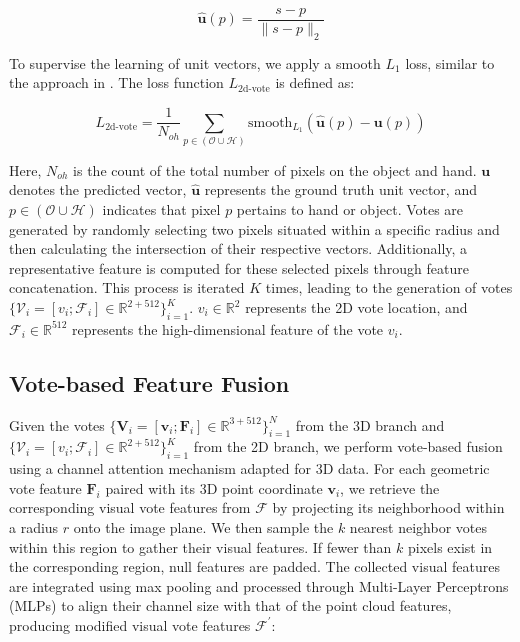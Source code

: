 \begin{equation} 
\hat{\mathbf{u}}(p) = \frac{s - p}{\parallel s - p \parallel_2}
\end{equation}

\noindent To supervise the learning of unit vectors, we apply a smooth $L_1$ loss, similar to the approach in \cite{girshick2015fast}. The loss function $L_{\text{2d-vote}}$ is defined as:

\begin{equation} 
L_{\text{2d-vote}} = \dfrac{1}{N_{oh}} \sum_{p \in (\mathcal{O} \cup \mathcal{H})} \text{smooth}_{L_1} ( \hat{\mathbf{u}}(p) - \mathbf{u}(p) )
\end{equation}

\noindent Here, $N_{oh}$ is the count of the total number of pixels on the object and hand. $\mathbf{u}$ denotes the predicted vector, $\hat{\mathbf{u}}$ represents the ground truth unit vector, and $p \in (\mathcal{O} \cup \mathcal{H})$ indicates that pixel $p$ pertains to hand or object. Votes are generated by randomly selecting two pixels situated within a specific radius and then calculating the intersection of their respective vectors. Additionally, a representative feature is computed for these selected pixels through feature concatenation. This process is iterated $K$ times, leading to the generation of votes $\{ \mathcal{V}_{i} = [v_i; \mathcal{F}_i] \in \mathbb{R}^{2+512} \}_{i=1}^{K}$. $v_i \in \mathbb{R}^2$ represents the 2D vote location, and $\mathcal{F}_i \in \mathbb{R}^{512}$ represents the high-dimensional feature of the vote $v_i$.

\subsection{Vote-based Feature Fusion}

Given the votes \(\{\mathbf{V}_i = [\mathbf{v}_i; \mathbf{F}_i] \in \mathbb{R}^{3+512}\}_{i=1}^{N}\) from the 3D branch and \(\{\mathcal{V}_i = [v_i; \mathcal{F}_i] \in \mathbb{R}^{2+512}\}_{i=1}^{K}\) from the 2D branch, we perform vote-based fusion using a channel attention mechanism adapted for 3D data. For each geometric vote feature \(\mathbf{F}_i\) paired with its 3D point coordinate \(\mathbf{v}_i\), we retrieve the corresponding visual vote features from \(\mathcal{F}\) by projecting its neighborhood within a radius \(r\) onto the image plane. We then sample the \(k\) nearest neighbor votes within this region to gather their visual features. If fewer than \(k\) pixels exist in the corresponding region, null features are padded. The collected visual features are integrated using max pooling and processed through Multi-Layer Perceptrons (MLPs) to align their channel size with that of the point cloud features, producing modified visual vote features \(\mathcal{F}^{'}\):

